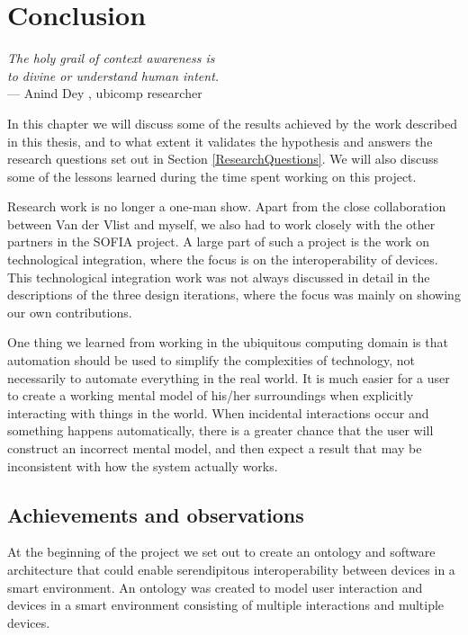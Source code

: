\chapter{Conclusion}
\label{Conclusion}

\begin{flushright}{\slshape    
The holy grail of context awareness is \\
to divine or understand human intent.} \\ \medskip
    ---  Anind Dey \cite{Dey}, ubicomp researcher
\end{flushright}

In this chapter we will discuss some of the results achieved by the work described in this thesis, and to what extent it validates the hypothesis and answers the research questions set out in Section \ref{ResearchQuestions}. We will also discuss some of the lessons learned during the time spent working on this project.

Research work is no longer a one-man show. Apart from the close collaboration between Van der Vlist \cite{Bram} and myself, we also had to work closely with the other partners in the \ac{SOFIA} project. A large part of such a project is the work on technological integration, where the focus is on the interoperability of devices. This technological integration work was not always discussed in detail in the descriptions of the three design iterations, where the focus was mainly on showing our own contributions. 

One thing we learned from working in the ubiquitous computing domain is that automation should be used to simplify the complexities of technology, not necessarily to automate everything in the real world. It is much easier for a user to create a working mental model of his/her surroundings when explicitly interacting with things in the world. When incidental interactions occur and something happens automatically, there is a greater chance that the user will construct an incorrect mental model, and then expect a result that may be inconsistent with how the system actually works.

\section{Achievements and observations}

At the beginning of the project we set out to create an ontology and software architecture that could enable serendipitous interoperability between devices in a smart environment. An ontology was created to model user interaction and devices in a smart environment consisting of multiple interactions and multiple devices.%

